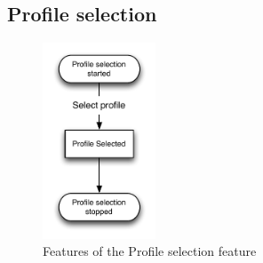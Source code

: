 \subsection{Profile selection}
\label{design:profile_selection}
\begin{figure}[h]
	\centering
	\includegraphics[width=0.3\textwidth]{gfx/profileselect_design.pdf}
	\caption{Features of the Profile selection feature}
	\label{fig:profileselection_design}
\end{figure}